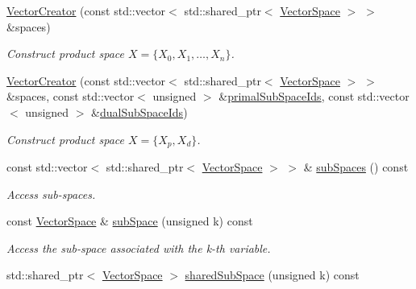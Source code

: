 \begin{DoxyCompactItemize}
\item 
\hyperlink{classSpacy_1_1ProductSpace_1_1VectorCreator_a73b6243d0ba00d019319e66bb06784dd_a73b6243d0ba00d019319e66bb06784dd}{Vector\+Creator} (const std\+::vector$<$ std\+::shared\+\_\+ptr$<$ \hyperlink{classSpacy_1_1VectorSpace}{Vector\+Space} $>$ $>$ \&spaces)
\begin{DoxyCompactList}\small\item\em Construct product space $ X = \{ X_0 , X_1 , \ldots , X_n \} $. \end{DoxyCompactList}\item 
\hyperlink{classSpacy_1_1ProductSpace_1_1VectorCreator_a5b1da48f6bc460c17c8d49717ac279e2_a5b1da48f6bc460c17c8d49717ac279e2}{Vector\+Creator} (const std\+::vector$<$ std\+::shared\+\_\+ptr$<$ \hyperlink{classSpacy_1_1VectorSpace}{Vector\+Space} $>$ $>$ \&spaces, const std\+::vector$<$ unsigned $>$ \&\hyperlink{classSpacy_1_1ProductSpace_1_1VectorCreator_a89612f21ccc70a36cc0c96dbc79616d4_a89612f21ccc70a36cc0c96dbc79616d4}{primal\+Sub\+Space\+Ids}, const std\+::vector$<$ unsigned $>$ \&\hyperlink{classSpacy_1_1ProductSpace_1_1VectorCreator_a8efa5277e276b058bbb08ea36cd02ec4_a8efa5277e276b058bbb08ea36cd02ec4}{dual\+Sub\+Space\+Ids})
\begin{DoxyCompactList}\small\item\em Construct product space $ X = \{ X_p , X_d \}$. \end{DoxyCompactList}\item 
const std\+::vector$<$ std\+::shared\+\_\+ptr$<$ \hyperlink{classSpacy_1_1VectorSpace}{Vector\+Space} $>$ $>$ \& \hyperlink{classSpacy_1_1ProductSpace_1_1VectorCreator_aa46303313c37f29cdfe54479d85cfe87_aa46303313c37f29cdfe54479d85cfe87}{sub\+Spaces} () const 
\begin{DoxyCompactList}\small\item\em Access sub-\/spaces. \end{DoxyCompactList}\item 
const \hyperlink{classSpacy_1_1VectorSpace}{Vector\+Space} \& \hyperlink{classSpacy_1_1ProductSpace_1_1VectorCreator_a4a74b3d51f41ba2ec1c6e755c520a5cc_a4a74b3d51f41ba2ec1c6e755c520a5cc}{sub\+Space} (unsigned k) const 
\begin{DoxyCompactList}\small\item\em Access the sub-\/space associated with the k-\/th variable. \end{DoxyCompactList}\item 
std\+::shared\+\_\+ptr$<$ \hyperlink{classSpacy_1_1VectorSpace}{Vector\+Space} $>$ \hyperlink{classSpacy_1_1ProductSpace_1_1VectorCreator_a184340fe2174c02561f2ceca8c21c490_a184340fe2174c02561f2ceca8c21c490}{shared\+Sub\+Space} (unsigned k) const 

\end{DoxyCompactItemize}
